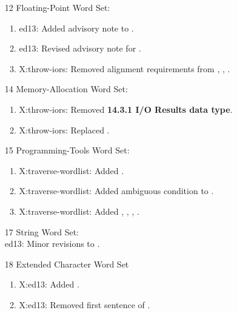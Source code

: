 \begin{itemize}
	\item[12] Floating-Point Word Set:			%
		\begin{enumerate}
		\item \textsf{ed13}: Added advisory note to .
		\item \textsf{ed13}: Revised advisory note for .
		\item \textsf{X:throw-iors}: Removed alignment requirements from
			,
			,
			.
		\end{enumerate}

	\item[14] Memory-Allocation Word Set:		%
		\begin{enumerate}
		\item \textsf{X:throw-iors}: Removed \textbf{14.3.1 I/O Results data type}.
		\item \textsf{X:throw-iors}: Replaced .
		\end{enumerate}

	\item[15] Programming-Tools Word Set:		%
		\begin{enumerate}
		\item \textsf{X:traverse-wordlist}: Added .
		\item \textsf{X:traverse-wordlist}: Added ambiguous condition to .
		\item \textsf{X:traverse-wordlist}: Added
			,
			,
			,
			.
		\end{enumerate}

	\item[17] String Word Set:						%
		~ \\
		\textsf{ed13}: Minor revisions to .

	\item[18] Extended Character Word Set		%
		\begin{enumerate}
		\item \textsf{X:ed13}: Added .
		\item \textsf{X:ed13}: Removed first sentence of .
		\end{enumerate}


\end{itemize}
